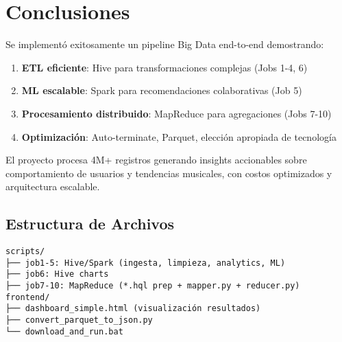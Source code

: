 \documentclass[11pt,a4paper]{article}
\begin{document}
\section{Conclusiones}

Se implementó exitosamente un pipeline Big Data end-to-end demostrando:

\begin{enumerate}
    \item \textbf{ETL eficiente}: Hive para transformaciones complejas (Jobs 1-4, 6)
    \item \textbf{ML escalable}: Spark para recomendaciones colaborativas (Job 5)
    \item \textbf{Procesamiento distribuido}: MapReduce para agregaciones (Jobs 7-10)
    \item \textbf{Optimización}: Auto-terminate, Parquet, elección apropiada de tecnología
\end{enumerate}

El proyecto procesa 4M+ registros generando insights accionables sobre comportamiento de usuarios y tendencias musicales, con costos optimizados y arquitectura escalable.

\subsection{Estructura de Archivos}
\begin{verbatim}
scripts/
├── job1-5: Hive/Spark (ingesta, limpieza, analytics, ML)
├── job6: Hive charts
├── job7-10: MapReduce (*.hql prep + mapper.py + reducer.py)
frontend/
├── dashboard_simple.html (visualización resultados)
├── convert_parquet_to_json.py
└── download_and_run.bat
\end{verbatim}
\end{document}

